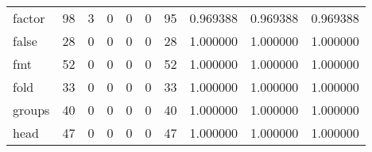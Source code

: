 \begin{tabular}{lrrrrrrrrr}
factor    &                                        98 &                                                  3 &                                                  0 &                                                  0 &                                                  0 &                                                 95 &                                           0.969388 &                               0.969388 &                             0.969388 \\
false     &                                        28 &                                                  0 &                                                  0 &                                                  0 &                                                  0 &                                                 28 &                                           1.000000 &                               1.000000 &                             1.000000 \\
fmt       &                                        52 &                                                  0 &                                                  0 &                                                  0 &                                                  0 &                                                 52 &                                           1.000000 &                               1.000000 &                             1.000000 \\
fold      &                                        33 &                                                  0 &                                                  0 &                                                  0 &                                                  0 &                                                 33 &                                           1.000000 &                               1.000000 &                             1.000000 \\
groups    &                                        40 &                                                  0 &                                                  0 &                                                  0 &                                                  0 &                                                 40 &                                           1.000000 &                               1.000000 &                             1.000000 \\
head      &                                        47 &                                                  0 &                                                  0 &                                                  0 &                                                  0 &                                                 47 &                                           1.000000 &                               1.000000 &                             1.000000 \\

\end{tabular}

